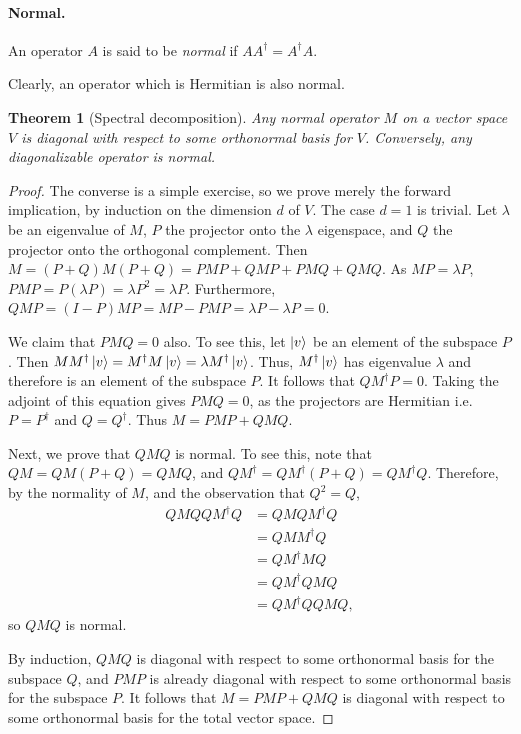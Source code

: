 \documentclass{article}
\newtheorem{theorem}{Theorem}
\begin{document}
\paragraph{Normal.} An operator $A$ is said to be \emph{normal} if $A A^\dagger = A^\dagger A$.

Clearly, an operator which is Hermitian is also normal.

\begin{theorem}[Spectral decomposition]
  Any normal operator $M$ on a vector space $V$ is diagonal with respect to some orthonormal basis for $V$. Conversely, any diagonalizable operator is normal.
\end{theorem}
\begin{proof}
  The converse is a simple exercise, so we prove merely the forward implication, by induction on the dimension $d$ of $V$. The case $d = 1$ is trivial. Let $\lambda$ be an eigenvalue of $M$, $P$ the projector onto the $\lambda$ eigenspace, and $Q$ the projector onto the orthogonal complement. Then $M = (P + Q)M(P + Q) = PMP + QMP + PMQ + QMQ$. As $MP = \lambda P$, $PMP = P(\lambda P) = \lambda P^2 = \lambda P$. Furthermore, $QMP = (I - P)MP = MP - PMP = \lambda P - \lambda P = 0$.

  We claim that $PMQ = 0$ also. To see this, let $\ket{v}$ be an element of the subspace $P$. Then $M M^\dagger \ket{v} = M^\dagger M \ket{v} = \lambda M^\dagger \ket{v}$. Thus, $M^\dagger \ket{v}$ has eigenvalue $\lambda$ and therefore is an element of the subspace $P$. It follows that $Q M^\dagger P = 0$. Taking the adjoint of this equation gives $PMQ = 0$, as the projectors are Hermitian i.e. $P = P^\dagger$ and $Q = Q^\dagger$. Thus $M = PMP + QMQ$.

  Next, we prove that $QMQ$ is normal. To see this, note that $QM = QM(P + Q) = QMQ$, and $Q M^\dagger = Q M^\dagger (P+Q) = Q M^\dagger Q$. Therefore, by the normality of $M$, and the observation that $Q^2 = Q$, \begin{align*}
    Q M Q Q M^\dagger Q &= Q M Q M^\dagger Q \\
      &= Q M M^\dagger Q \\
      &= Q M^\dagger M Q \\
      &= Q M^\dagger Q M Q \\
      &= Q M^\dagger Q Q M Q,
  \end{align*} so $QMQ$ is normal.

  By induction, $QMQ$ is diagonal with respect to some orthonormal basis for the subspace $Q$, and $PMP$ is already diagonal with respect to some orthonormal basis for the subspace $P$. It follows that $M = PMP + QMQ$ is diagonal with respect to some orthonormal basis for the total vector space.
\end{proof}
\end{document}

